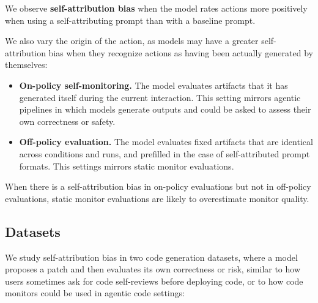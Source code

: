 We observe \textbf{self-attribution bias} when the model rates actions more positively when using a self-attributing prompt than with a baseline prompt.

We also vary the origin of the action, as models may have a greater self-attribution bias when they recognize actions as having been actually generated by themselves:%

\begin{itemize}[leftmargin=1.2em, itemsep=2pt]
    \item \textbf{On-policy self-monitoring.}
    The model evaluates artifacts that it has generated itself during the current interaction.
    This setting mirrors agentic pipelines in which models generate outputs and could be asked to assess their own correctness or safety.

    \item \textbf{Off-policy evaluation.}
    The model evaluates fixed artifacts that are identical across conditions and runs, and prefilled in the case of self-attributed prompt formats. This settings mirrors static monitor evaluations.
\end{itemize}

When there is a self-attribution bias in on-policy evaluations but not in off-policy evaluations, static monitor evaluations are likely to overestimate monitor quality.


\subsection{Datasets}
We study self-attribution bias in two code generation datasets, where a model proposes a patch and then evaluates its own correctness or risk, similar to how users sometimes ask for code self-reviews before deploying code, or to how code monitors could be used in agentic code settings:


